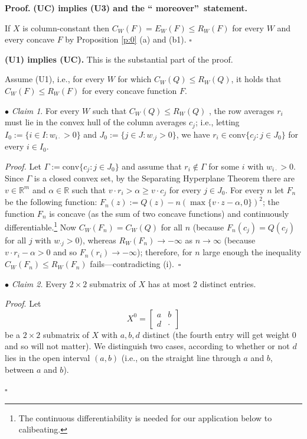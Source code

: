 \documentclass[12pt,a4paper,notitlepage]{article}
\newenvironment{proof}[1][Proof]{\noindent\textbf{#1.} }{\hfill $\square$}
\begin{document}
\begin{proof}
\textbf{(UC) implies (U3) and the \textquotedblleft
moreover\textquotedblright\ statement.}

If $X$ is column-constant then $C_{W}(F)=E_{W}(F)\leq R_{W}(F)$ for every $W$
and every concave $F$ by Proposition \ref{p:0} (a) and (b1). $\square $

\textbf{(U1) implies (UC). }This is the substantial part of the proof.

Assume (U1), i.e., for every $W$ for which $C_{W}(Q)\leq R_{W}(Q)$, it holds
that $C_{W}(F)\leq R_{W}(F)$ for every concave function $F$.

$\bullet $ \emph{Claim 1}$.$ For every $W$ such that $C_{W}(Q)\leq R_{W}(Q)$%
, the row averages $r_{i}$ must lie in the convex hull of the column
averages $c_{j}$; i.e., letting $I_{0}:=\{i\in I:w_{i\cdot }>0\}$ and $%
J_{0}:=\{j\in J:w_{\cdot j}>0\}$, we have $r_{i}\in \mathrm{conv}%
\{c_{j}:j\in J_{0}\}$ for every $i\in I_{0}$.

\emph{Proof. }Let $\Gamma :=\mathrm{conv}\{c_{j}:j\in J_{0}\}$ and assume
that $r_{i}\notin \Gamma $ for some $i$ with $w_{i\cdot }>0.$ Since $\Gamma $
is a closed convex set, by the Separating Hyperplane Theorem there are $v\in 
\mathbb{R}^{m}$ and $\alpha \in \mathbb{R}$ such that $v\cdot r_{i}>\alpha
\geq v\cdot c_{j}$ for every $j\in J_{0}$. For every $n$ let $F_{n}$ be the
following function: $F_{n}(z):=Q(z)-n(\max \{v\cdot z-\alpha ,0\})^{2}$; the
function $F_{n}$ is concave (as the sum of two concave functions) and
continuously differentiable.\footnote{\label{ft:smooth}The continuous
differentiability is needed for our application below to calibeating.} Now $%
C_{W}(F_{n})=C_{W}(Q)$ for all $n$ (because $F_{n}(c_{j})=Q(c_{j})$ for all $%
j$ with $w_{\cdot j}>0$), whereas $R_{W}(F_{n})\rightarrow -\infty $ as $%
n\rightarrow \infty $ (because $v\cdot r_{i}-\alpha >0$ and so $%
F_{n}(r_{i})\rightarrow -\infty $); therefore, for $n$ large enough the
inequality $C_{W}(F_{n})\leq R_{W}(F_{n})$ fails---contradicting (i).~$%
\square $

$\bullet $ \emph{Claim 2. }Every $2\times 2$ submatrix of $X$ has at most $2$
distinct entries.

\emph{Proof}. Let 
\begin{equation*}
X^{0}=\left[ 
\begin{array}{cc}
a & b \\ 
d & \cdot 
\end{array}%
\right] 
\end{equation*}
be a $2\times 2$ submatrix of $X$ with $a,b,d$ distinct (the fourth entry
will get weight $0$ and so will not matter). We distinguish two cases,
according to whether or not $d$ lies in the open interval $(a,b)$ (i.e., on
the straight line through $a$ and $b$, between $a$ and $b$).


\end{proof}
\end{document}
